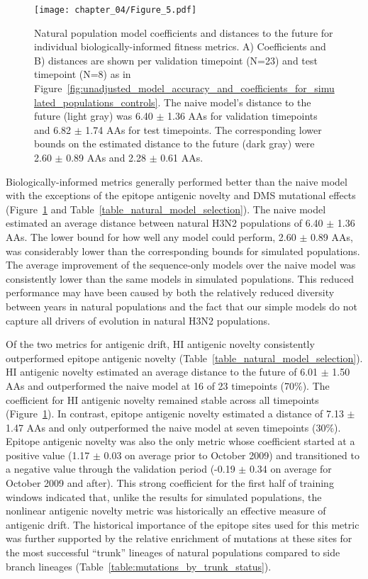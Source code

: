 \begin{figure}
  \texttt{[image: chapter\_04/Figure\_5.pdf]}
  \caption{
    Natural population model coefficients and distances to the future for individual biologically-informed fitness metrics.
    A) Coefficients and B) distances are shown per validation timepoint (N=23) and test timepoint (N=8) as in Figure~\ref{fig:unadjusted_model_accuracy_and_coefficients_for_simulated_populations_controls}.
    The naive model's distance to the future (light gray) was 6.40 $\pm$ 1.36 AAs for validation timepoints and 6.82 $\pm$ 1.74 AAs for test timepoints.
    The corresponding lower bounds on the estimated distance to the future (dark gray) were 2.60 $\pm$ 0.89 AAs and 2.28 $\pm$ 0.61 AAs.
  }
  \label{fig:unadjusted_model_accuracy_and_coefficients_for_natural_populations}
\end{figure}

Biologically-informed metrics generally performed better than the naive model with the exceptions of the epitope antigenic novelty and DMS mutational effects (Figure~\ref{fig:unadjusted_model_accuracy_and_coefficients_for_natural_populations} and Table~\ref{table_natural_model_selection}).
The naive model estimated an average distance between natural H3N2 populations of 6.40 $\pm$ 1.36 AAs.
The lower bound for how well any model could perform, 2.60 $\pm$ 0.89 AAs, was considerably lower than the corresponding bounds for simulated populations.
The average improvement of the sequence-only models over the naive model was consistently lower than the same models in simulated populations.
This reduced performance may have been caused by both the relatively reduced diversity between years in natural populations and the fact that our simple models do not capture all drivers of evolution in natural H3N2 populations.

Of the two metrics for antigenic drift, HI antigenic novelty consistently outperformed epitope antigenic novelty (Table~\ref{table_natural_model_selection}).
HI antigenic novelty estimated an average distance to the future of 6.01 $\pm$ 1.50 AAs and outperformed the naive model at 16 of 23 timepoints (70\%).
The coefficient for HI antigenic novelty remained stable across all timepoints (Figure~\ref{fig:unadjusted_model_accuracy_and_coefficients_for_natural_populations}).
In contrast, epitope antigenic novelty estimated a distance of 7.13 $\pm$ 1.47 AAs and only outperformed the naive model at seven timepoints (30\%).
Epitope antigenic novelty was also the only metric whose coefficient started at a positive value (1.17 $\pm$ 0.03 on average prior to October 2009) and transitioned to a negative value through the validation period (-0.19 $\pm$ 0.34 on average for October 2009 and after).
This strong coefficient for the first half of training windows indicated that, unlike the results for simulated populations, the nonlinear antigenic novelty metric was historically an effective measure of antigenic drift.
The historical importance of the epitope sites used for this metric was further supported by the relative enrichment of mutations at these sites for the most successful ``trunk'' lineages of natural populations compared to side branch lineages (Table~\ref{table:mutations_by_trunk_status}).

